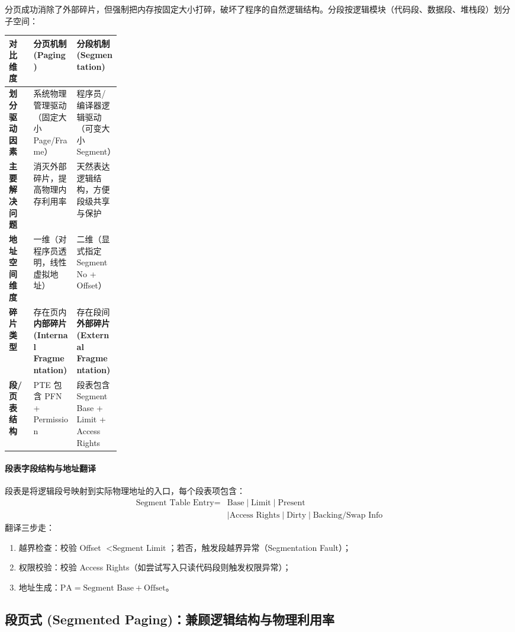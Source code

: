 \documentclass[11pt,a4paper]{ctexart}
\newcommand{\kw}[1]{\textbf{#1}}
\begin{document}
分页成功消除了外部碎片，但强制把内存按固定大小打碎，破坏了程序的自然逻辑结构。分段按逻辑模块（代码段、数据段、堆栈段）划分子空间：

\begingroup
\small
\renewcommand{\arraystretch}{1.25}
\setlength{\tabcolsep}{3pt}
\noindent\begin{tabularx}{\linewidth}{>{\bfseries}p{0.22\linewidth} X X}
\toprule
对比维度 & 分页机制 (Paging) & 分段机制 (Segmentation)\\
\midrule
划分驱动因素 & 系统物理管理驱动（固定大小 Page/Frame） & 程序员/编译器逻辑驱动（可变大小 Segment）\\
主要解决问题 & 消灭外部碎片，提高物理内存利用率 & 天然表达逻辑结构，方便段级共享与保护\\
地址空间维度 & 一维（对程序员透明，线性虚拟地址） & 二维（显式指定 Segment No + Offset）\\
碎片类型 & 存在页内\kw{内部碎片 (Internal Fragmentation)} & 存在段间\kw{外部碎片 (External Fragmentation)}\\
段/页表结构 & PTE 包含 PFN + Permission & 段表包含 Segment Base + Limit + Access Rights\\
\bottomrule
\end{tabularx}
\endgroup

\paragraph{段表字段结构与地址翻译}
段表是将逻辑段号映射到实际物理地址的入口，每个段表项包含：
\[
\boxed{
\begin{aligned}
\text{Segment Table Entry}={}&\text{Base}\mid\text{Limit}\mid\text{Present}\\
&\mid\text{Access Rights}\mid\text{Dirty}\mid\text{Backing/Swap Info}
\end{aligned}}
\]
翻译三步走：
\begin{enumerate}
  \item 越界检查：校验 Offset $< \text{Segment Limit}$；若否，触发段越界异常（Segmentation Fault）；
  \item 权限校验：校验 Access Rights（如尝试写入只读代码段则触发权限异常）；
  \item 地址生成：$\text{PA} = \text{Segment Base} + \text{Offset}$。
\end{enumerate}

\subsection{段页式 (Segmented Paging)：兼顾逻辑结构与物理利用率}
\end{document}
